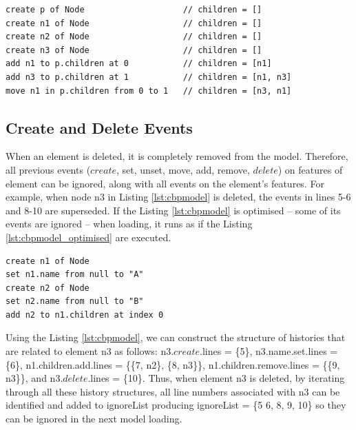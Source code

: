 {\vspace{-20pt}
\begin{lstlisting}[style=eol,caption={A naive optimised CBP representation of original CBP representation in Listing \ref{lst:add_remove_move_reference} .},label=lst:naive_add_remove_move_reference]
create p of Node                    // children = []
create n1 of Node                   // children = []
create n2 of Node                   // children = []
create n3 of Node                   // children = []
add n1 to p.children at 0           // children = [n1]
add n3 to p.children at 1           // children = [n1, n3]
move n1 in p.children from 0 to 1   // children = [n3, n1]
\end{lstlisting}

\subsection{Create and Delete Events}
\label{subsec:create_and_delete_operations}

When an element is deleted, it is completely removed from the model. Therefore, all previous events ($create$, \textsf{set}, \textsf{unset}, \textsf{move}, \textsf{add}, \textsf{remove}, $delete$) on features of element can be ignored, along with all events on the element's features. For example, when node \textsf{n3} in Listing \ref{lst:cbpmodel} is deleted, the events in lines 5-6 and 8-10 are superseded. If the Listing \ref{lst:cbpmodel} is optimised -- some of its events are ignored -- when loading, it runs as if the Listing \ref{lst:cbpmodel_optimised} are executed.

\vspace{-20pt}
\begin{lstlisting}[style=eol,caption={Change-based representation of the model in Figure \ref{fig:tree_example} after removal of node \textsf{n3}.},label=lst:cbpmodel_optimised]
create n1 of Node
set n1.name from null to "A"
create n2 of Node
set n2.name from null to "B"
add n2 to n1.children at index 0
\end{lstlisting}

Using the Listing \ref{lst:cbpmodel}, we can construct the structure of histories that are related to element \textsf{n3} as follows: \textsf{n3}.$create$.\textsf{lines} = \{5\}, \textsf{n3}.\textsf{name}.\textsf{set}.\textsf{lines} = \{6\}, \textsf{n1}.\textsf{children}.\textsf{add}.\textsf{lines} = \{\{7, \textsf{n2}\}, \{8, \textsf{n3}\}\}, \textsf{n1}.\textsf{children}.\textsf{remove}.\textsf{lines} = \{\{9, \textsf{n3}\}\}, and \textsf{n3}.$delete$.\textsf{lines} = \{10\}. Thus, when element \textsf{n3} is deleted, by iterating through all these history structures, all line numbers associated with \textsf{n3} can be identified and added to \textsf{ignoreList} producing \textsf{ignoreList} = \{5 6, 8, 9, 10\} so they can be ignored in the next model loading.

}
